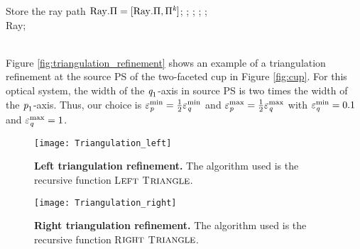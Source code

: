 \begin{algorithm}[h]
\begin{algorithmic}[1]
\State Store the ray path $\mbox{\textrm{Ray}}.\Pi= [\mbox{\textrm{Ray}}.\Pi, \Pi^{\textit{k}}]$;
\EndIf
\EndFor
\State{};
\State{};
\State{};
\State{};
\EndIf \\
\Return \textrm{Ray};
\EndProcedure
\end{algorithmic}
\end{algorithm}
\\ \indent Figure \ref{fig:triangulation_refinement} shows an example of a triangulation refinement at the source PS of the two-faceted cup in Figure \ref{fig:cup}. 
For this optical system, the width of the $\textit{q}_1$-axis in source PS is two times the width of the $\textit{p}_1$-axis.
Thus, our choice is $\varepsilon_{\textit{p}}^{\textrm{min}}=\frac{1}{2}\varepsilon_{\textit{q}}^{\textrm{min}}$ and $\varepsilon_{\textit{p}}^{\textrm{max}} = \frac{1}{2}\varepsilon_{\textit{q}}^{\textrm{max}}$
with $\varepsilon_{\textit{q}}^{\textrm{min}}=0.1$ and $\varepsilon_{\textit{q}}^{\textrm{max}}=1$.
 \begin{figure}[h]
 \begin{minipage}[h]{0.48\textwidth}
\centering
    \texttt{[image: Triangulation\_left]}
    \caption{\textbf{Left triangulation refinement.} The algorithm used is the recursive function L$\footnotesize{\textrm{EFT}}$ T$\footnotesize{\textrm{RIANGLE}}$.}
    \label{fig:triangulation_left}
\end{minipage}
\hfill
\begin{minipage}[h]{0.48\textwidth}
\centering
    \texttt{[image: Triangulation\_right]}
    \caption{\textbf{Right triangulation refinement.} The algorithm used is the recursive function R$\footnotesize{\textrm{IGHT}}$ T$\footnotesize{\textrm{RIANGLE}}$.}
    \label{fig:triangulation_right}
\end{minipage}
\end{figure}
